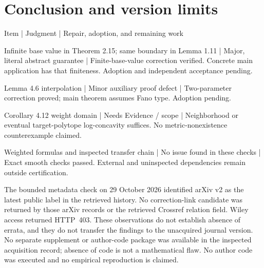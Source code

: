 \documentclass[10pt]{article}
\begin{document}
\section*{Conclusion and version limits}
Item | Judgment | Repair, adoption, and remaining work\par
Infinite base value in Theorem 2.15; same boundary in Lemma 1.11 | Major, literal abstract guarantee | Finite-base-value correction verified. Concrete main application has that finiteness. Adoption and independent acceptance pending.\par
Lemma 4.6 interpolation | Minor auxiliary proof defect | Two-parameter correction proved; main theorem assumes Fano type. Adoption pending.\par
Corollary 4.12 weight domain | Needs Evidence / scope | Neighborhood or eventual target-polytope log-concavity suffices. No metric-nonexistence counterexample claimed.\par
Weighted formulas and inspected transfer chain | No issue found in these checks | Exact smooth checks passed. External and uninspected dependencies remain outside certification.\par
The bounded metadata check on 29 October 2026 identified arXiv v2 as the latest public label in the retrieved history. No correction-link candidate was returned by those arXiv records or the retrieved Crossref relation field. Wiley access returned HTTP 403. These observations do not establish absence of errata, and they do not transfer the findings to the unacquired journal version. No separate supplement or author-code package was available in the inspected acquisition record; absence of code is not a mathematical flaw. No author code was executed and no empirical reproduction is claimed.\par
\end{document}
